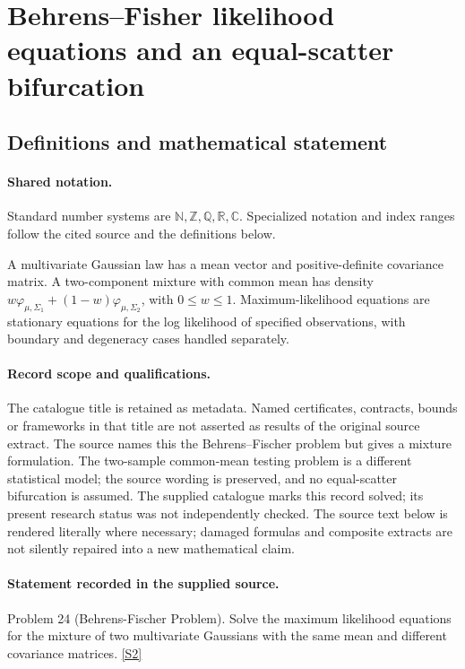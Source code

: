 \documentclass[11pt]{article}
\newcommand{\sref}[2]{\hyperlink{source:#1:#2}{[S#2]}}
\begin{document}
\section{Behrens–Fisher likelihood equations and an equal-scatter bifurcation}\label{statement}

\subsection{Definitions and mathematical statement}

\paragraph{Shared notation.}Standard number systems are $\mathbb N,\mathbb Z,\mathbb Q,\mathbb R,\mathbb C$. Specialized notation and index ranges follow the cited source and the definitions below.


A multivariate Gaussian law has a mean vector and positive-definite covariance matrix. A two-component mixture with common mean has density $w\varphi_{\mu,\Sigma_1}+(1-w)\varphi_{\mu,\Sigma_2}$, with $0\leq w\leq1$. Maximum-likelihood equations are stationary equations for the log likelihood of specified observations, with boundary and degeneracy cases handled separately.
\paragraph{Record scope and qualifications.}
The catalogue title is retained as metadata. Named certificates, contracts, bounds or frameworks in that title are not asserted as results of the original source extract.
The source names this the Behrens--Fischer problem but gives a mixture formulation. The two-sample common-mean testing problem is a different statistical model; the source wording is preserved, and no equal-scatter bifurcation is assumed. The supplied catalogue marks this record solved; its present research status was not independently checked.
The source text below is rendered literally where necessary; damaged formulas and composite extracts are not silently repaired into a new mathematical claim.
\paragraph{Statement recorded in the supplied source.}
Problem 24 (Behrens-Fischer Problem). Solve the maximum likelihood equations for the mixture of two multivariate Gaussians with the same mean and different covariance matrices. \sref{statement}{2}
\end{document}

